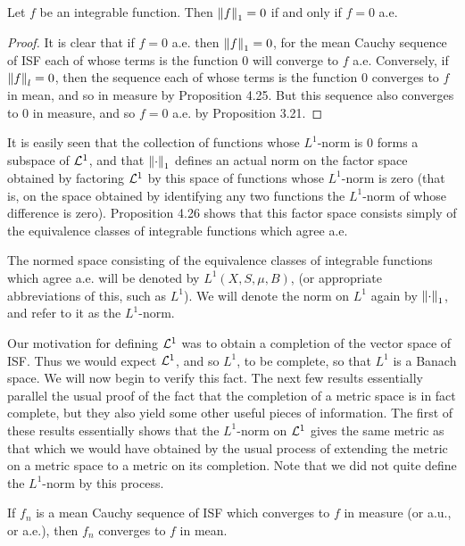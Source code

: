 \begin{proposition}
Let $f$ be an integrable function. Then $\norm{f}_1=0$ if and only if $f=0$ a.e.
\end{proposition}

\begin{proof}
It is clear that if $f=0$ a.e. then $\norm{f}_1=0$, for the mean Cauchy sequence of ISF each of whose terms is the function $0$ will converge to $f$ a.e. Conversely, if $\norm{f}_l=0$, then the sequence each of whose terms is the function 0 converges to $f$ in mean, and so in measure by Proposition 4.25. But this sequence also converges to $0$ in measure, and so $f=0$ a.e. by Proposition 3.21.
\end{proof}

It is easily seen that the collection of functions whose $L^1$-norm is $0$ forms a subspace of ${\cal L}^1$, and that $\norm{\cdot}_1$ defines an actual norm on the factor space obtained by factoring ${\cal L}^1$ by this space of functions whose $L^1$-norm is zero (that is, on the space obtained by identifying any two functions the $L^1$-norm of whose difference is zero). Proposition 4.26 shows that this factor space consists simply of the equivalence classes of integrable functions which agree a.e.

\begin{definition}
The normed space consisting of the equivalence classes of integrable functions which agree a.e. will be denoted by $L^1(X,S,\mu,B)$, (or appropriate abbreviations of this, such as $L^1$). We will denote the norm on $L^1$ again by $\norm{\cdot}_1$, and refer to it as the $L^1$-norm.
\end{definition}

Our motivation for defining ${\cal L}^1$ was to obtain a completion of the vector space of ISF. Thus we would expect ${\cal L}^1$, and so $L^1$, to be complete, so that $L^1$ is a Banach space. We will now begin to verify this fact. The next few results essentially parallel the usual proof of the fact that the completion of a metric space is in fact complete, but they also yield some other useful pieces of information. The first of these results essentially shows that the $L^1$-norm on ${\cal L}^1$ gives the same metric as that which we would have obtained by the usual process of extending the metric on a metric space to a metric on its completion. Note that we did not quite define the $L^1$-norm by this process.

\begin{lemma}
If $f_n$ is a mean Cauchy sequence of ISF which converges to $f$ in measure (or a.u., or a.e.), then $f_n$ converges to $f$ in mean.
\end{lemma}


